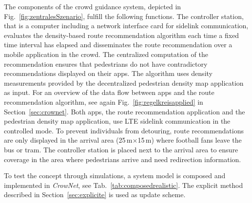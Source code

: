The components of the crowd guidance system, depicted in Fig.~\ref{fig:zentralesSzenario}, fulfill the following functions. The controller station, that is a computer including a network interface card for sidelink communication, evaluates the density-based route recommendation algorithm each time a fixed time interval has elapsed and disseminates the route recommendation over a mobile application in the crowd. 
The centralized computation of the  recommendation ensures that pedestrians do not have contradictory recommendations displayed on their apps.
The algorithm uses density measurements provided by the decentralized pedestrian density map application as input. For an overview of the data flow between apps and the route recommendation algorithm, see again Fig.~\ref{fig:regelkreisapplied} in Section~\ref{sec:crownet}.
Both apps, the route recommendation application and the pedestrian density map application, use LTE sidelink communication in the controlled mode. To prevent individuals from detouring, route recommendations are only displayed in the arrival area (25\,m$\times$15\,m) where football fans leave the bus or tram. The controller station is placed next to the arrival area to ensure coverage in the area where pedestrians arrive and need redirection information.

To test the concept through simulations, a system model is composed and implemented in \textit{CrowNet}, see Tab.~\ref{tab:composedrealistic}. The explicit method described in Section~\ref{sec:explicite} is used as update scheme. 

